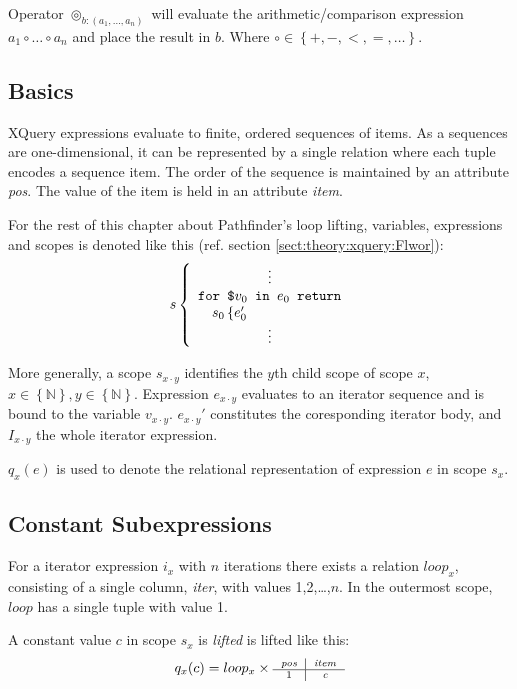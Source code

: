Operator $\circledcirc_{b:(a_{1},\ldots,a_{n})}$ will evaluate the arithmetic/comparison expression $a_{1} \circ
\ldots \circ a_{n}$ and place the result in $b$. Where $\circ \in \left\{ +,- , <, =, \ldots  \right\} $.


\subsection{Basics}
\label{sect:trans:ll:Basics}
XQuery expressions evaluate to finite, ordered sequences of items. As a sequences are one-dimensional, it can be
represented by a single relation where each tuple encodes a sequence item. The order of the sequence is
maintained by an attribute \textit{pos}. The value of the item is held in an attribute \textit{item}. 

For the rest of this chapter about Pathfinder's loop lifting, variables, expressions and scopes is denoted like
this (ref. section \ref{sect:theory:xquery:Flwor}):
\[
s \left\{
\begin{array}{l}
\qquad \qquad \quad \vdots \\
\mbox{\texttt{for \$}}v_{0}\mbox{\texttt{ in }} e_{0} \mbox{\texttt{ return}} \\
\quad s_{0} \left\{ e_{0}' \right. \\
\qquad \qquad \quad \vdots
\end{array}
\right.
\]

More generally, a scope $s_{x \cdot y}$ identifies the $y$th child scope of scope $x$, $x \in \left\{
\mathbb{N}\right\}, y \in \left\{ \mathbb{N} \right\}$. Expression $e_{x\cdot y}$ evaluates to an iterator sequence
and is bound to the variable $v_{x \cdot y}$. $e_{x \cdot y}'$ constitutes the coresponding iterator body, and $I_{x \cdot y}$ the whole iterator expression.

$q_{x}(e)$ is used to denote the relational representation of expression $e$ in scope $s_{x}$.


\subsection{Constant Subexpressions}
\label{sect:trans:ll:ConstExprs}

For a iterator expression $i_{x}$ with $n$ iterations there exists a relation $loop_{x}$, consisting of a
single column, \textit{iter}, with values 1,2,\ldots,$n$. In the outermost scope, $loop$ has a single tuple with
value 1.

A constant value $c$ in scope $s_{x}$ is \textit{lifted} is lifted like this:
\begin{equation}
q_{x}(c) =  loop_{x} \times \mbox{\scriptsize \begin{tabular}{c|c} \textit{pos}&\textit{item} \\
\hline 1 & \textit{c}
\end{tabular}}
\label{eq:ll:constLoopLift}
\end{equation}

